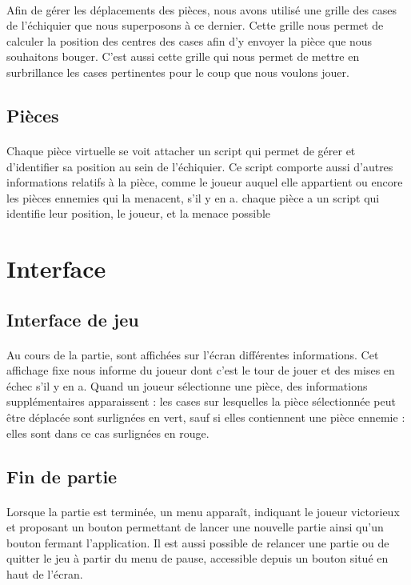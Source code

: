 \documentclass{article}
\begin{document}
\paragraph{}Afin de gérer les déplacements des pièces, nous avons utilisé une grille des cases de l'échiquier que nous superposons à ce dernier. Cette grille nous permet de calculer la position des centres des cases afin d'y envoyer la pièce que nous souhaitons bouger. C'est aussi cette grille qui nous permet de mettre en surbrillance les cases pertinentes pour le coup que nous voulons jouer.
\subsection{Pièces}
\paragraph{}Chaque pièce virtuelle se voit attacher un script qui permet de gérer et d'identifier sa position au sein de l'échiquier. Ce script comporte aussi d'autres informations relatifs à la pièce, comme le joueur auquel elle appartient ou encore les pièces ennemies qui la menacent, s'il y en a.
chaque pièce a un script qui identifie leur position, le joueur, et la menace possible
\section{Interface}
\subsection{Interface de jeu}
\paragraph{}Au cours de la partie, sont affichées sur l'écran différentes informations. Cet affichage fixe nous informe du joueur dont c'est le tour de jouer et des mises en échec s'il y en a. Quand un joueur sélectionne une pièce, des informations supplémentaires apparaissent : les cases sur lesquelles la pièce sélectionnée peut être déplacée sont surlignées en vert, sauf si elles contiennent une pièce ennemie : elles sont dans ce cas surlignées en rouge.
\subsection{Fin de partie}
\paragraph{}Lorsque la partie est terminée, un menu apparaît, indiquant le joueur victorieux et proposant un bouton permettant de lancer une nouvelle partie ainsi qu'un bouton fermant l'application. Il est aussi possible de relancer une partie ou de quitter le jeu à partir du menu de pause, accessible depuis un bouton situé en haut de l'écran.
\end{document}
